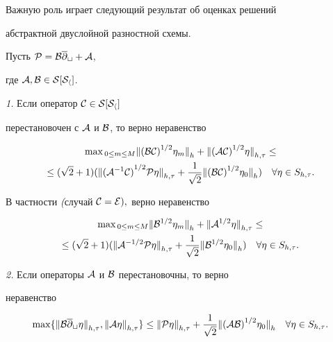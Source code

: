 Важную роль играет следующий результат об оценках решений 


абстрактной двуслойной разностной схемы.


Пусть $\cal P=\cal B{\overline\partial}_t+\cal A $,


где $\cal A,\cal B\in\cal S[S_h]$.





\begin{lem} {\em 1.} Если оператор $\cal C\in\cal S[S_h]$


перестановочен с $\cal A$ и $\cal B$, то верно неравенство 


\begin{gather}


{\ma {(\cal B\cal C)}^{1/2}\eta_m\ver}_h+


{\ver{(\cal A\cal C)}^{1/2}\eta\ver}_{h,\tau}\le\notag \\


%


\le(\sqrt 2+1)(


{\ver{({\cal A}^{-1}\cal C)}^{1/2}\cal P\eta\ver}_{h,\tau}+\frac{1}{\sqrt 2}


{\ver{(\cal B\cal C)}^{1/2}\eta_0\ver}_h)


 \quad \forall\eta\in S_{h,\tau}.


\end{gather}


%


В частности {\em (}случай $\cal C=E),$ верно неравенство


\begin{gather}


{\ma {\cal B}^{1/2}\eta_m\ver}_h+{\ver{\cal A}^{1/2}\eta\ver}_{h,\tau}


\le \notag \\


%


\le(\sqrt 2+1)(


{\ver{\cal A}^{-1/2}\cal P\eta\ver}_{h,\tau}+


 \frac{1}{\sqrt 2}{\ver{\cal B}^{1/2}\eta_0\ver}_h)


 \quad\forall\eta\in S_{h,\tau}.


\end{gather}





{\em 2.} Если операторы $\cal A$ и $\cal B$ перестановочны, то верно 


неравенство


\begin{equation}


\max\{ {\ver \cal B{\overline\partial}_t\eta\ver}_{h,\tau},


{\ver \cal A\eta\ver}_{h,\tau}\}


\le{\ver\cal P\eta\ver}_{h,\tau}+\frac{1}{\sqrt 2}


{\ver{(\cal A\cal B)}^{1/2}\eta_0\ver}_h \quad\forall


\eta\in S_{h,\tau}.


\end{equation}


\end{lem}

